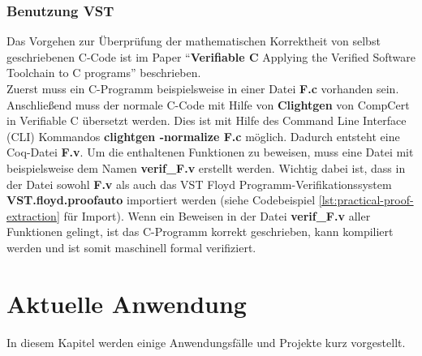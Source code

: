 \subsubsection{Benutzung VST}
Das Vorgehen zur Überprüfung der mathematischen Korrektheit von selbst geschriebenen C-Code ist im Paper "`\textbf{Verifiable C} Applying the Verified Software Toolchain to C programs"' beschrieben.\cite{Appel01:VST}\\
Zuerst muss ein C-Programm beispielsweise in einer Datei \textbf{F.c} vorhanden sein. Anschließend muss der normale C-Code mit Hilfe von \textbf{Clightgen} von CompCert in Verifiable C übersetzt werden. Dies ist mit Hilfe des Command Line Interface (CLI) Kommandos \textbf{clightgen -normalize F.c} möglich. Dadurch entsteht eine Coq-Datei \textbf{F.v}. Um die enthaltenen Funktionen zu beweisen, muss eine Datei mit beispielsweise dem Namen \textbf{verif\_F.v} erstellt werden. Wichtig dabei ist, dass in der Datei sowohl \textbf{F.v} als auch das VST Floyd Programm-Verifikationssystem \textbf{VST.floyd.proofauto} importiert werden (siehe Codebeispiel \ref{lst:practical-proof-extraction} für Import). Wenn ein Beweisen in der Datei \textbf{verif\_F.v} aller Funktionen gelingt, ist das C-Programm korrekt geschrieben, kann kompiliert werden und ist somit maschinell formal verifiziert.


\section{Aktuelle Anwendung}
\label{s:current-usage}
In diesem Kapitel werden einige Anwendungsfälle und Projekte kurz vorgestellt.

